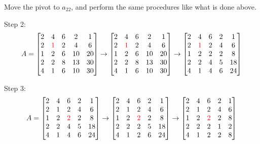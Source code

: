 \documentclass[a4paper,titlepage]{article}
\begin{document}
		Move the pivot to $a_{22}$, and perform the same procedures like what is done above. 
		
		Step 2:
		$$
			A = \begin{bmatrix}				
				2 & 4 & 6 & 2 & 1\\
				2 & \textcolor{red}{1} & 2 & 4 & 6\\
				1 & 2 & 6 & 10 & 20\\
				2 & 2 & 8 & 13 & 30\\
				4 & 1 & 6 & 10 & 30
			\end{bmatrix} \rightarrow \begin{bmatrix}				
				2 & 4 & 6 & 2 & 1\\
				2 & \textcolor{red}{1} & 2 & 4 & 6\\
				1 & 2 & 6 & 10 & 20\\
				2 & 2 & 8 & 13 & 30\\
				4 & 1 & 6 & 10 & 30
			\end{bmatrix} \rightarrow \begin{bmatrix}				
				2 & 4 & 6 & 2 & 1\\
				2 & \textcolor{red}{1} & 2 & 4 & 6\\
				1 & 2 & 2 & 2 & 8\\
				2 & 2 & 4 & 5 & 18\\
				4 & 1 & 4 & 6 & 24
			\end{bmatrix}
		$$
		
		Step 3:
		$$
		A = \begin{bmatrix}				
				2 & 4 & 6 & 2 & 1\\
				2 & 1 & 2 & 4 & 6\\
				1 & 2 & \textcolor{red}{2} & 2 & 8\\
				2 & 2 & 4 & 5 & 18\\
				4 & 1 & 4 & 6 & 24
			\end{bmatrix} \rightarrow \begin{bmatrix}				
				2 & 4 & 6 & 2 & 1\\
				2 & 1 & 2 & 4 & 6\\
				1 & 2 & \textcolor{red}{2} & 2 & 8\\
				2 & 2 & 2 & 5 & 18\\
				4 & 1 & 2 & 6 & 24
			\end{bmatrix} \rightarrow \begin{bmatrix}				
				2 & 4 & 6 & 2 & 1\\
				2 & 1 & 2 & 4 & 6\\
				1 & 2 & \textcolor{red}{2} & 2 & 8\\
				2 & 2 & 2 & 1 & 2\\
				4 & 1 & 2 & 2 & 8
			\end{bmatrix}
		$$
		
\end{document}
